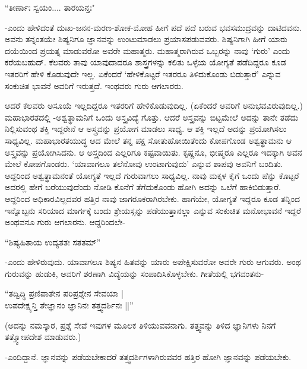 \begin{shloka}
``ತೀರ್ಣಾಃ ಸ್ವಯಂ.... ತಾರಯನ್ತಃ"
\end{shloka}

-ಎಂದು ಹೇಳಿದಂತೆ ದುಃಖ-ಜನನ-ಮರಣ-ಶೋಕ-ಮೋಹ ಹೀಗೆ ಪದೆ ಪದೆ ಬರುವ ಭವಸಮುದ್ರವನ್ನು ದಾಟಿದವನು. ಅವನು ತನ್ನಂತಯೇ ಶಿಷ್ಯನಿಗೂ ಜ್ಞಾನವನ್ನು ಉಂಟುಮಾಡಲು ಪ್ರಯಾಸಪಡುವವರು. ಶಿಷ್ಯನಿಗಾಗಿ ಹೀಗೆ ಯಾರು ದಯೆಯಿಂದ ಪ್ರಯತ್ನ ಮಾಡುವರೋ ಅವರೇ ಮಹಾತ್ಮರು. ಮಹಾತ್ಮರಾಗಿರುವ ಒಬ್ಬರನ್ನು ನಾವು `ಗುರು' ಎಂದು ಕರೆಯಬಹುದ್. ಕೆಲವರು ತಾವು ಯಾವುದಾದರೂ ಶಾಸ್ತ್ರಗಳನ್ನು ಕಲಿತು ಒಳ್ಳೆಯ ಯೋಗ್ಯತೆ ಪಡೆದಿದ್ದರೂ ಕೂಡ ಇತರರಿಗೆ ಹೇಳಿ ಕೊಡುವುದೇ ಇಲ್ಲ. ಏಕೆಂದರೆ `ಹೇಳಿಕೊಟ್ಟರೆ ಇತರರೂ ತಿಳಿದುಕೊಂಡು ಬಿಡುತ್ತಾರೆ' ಎನ್ನುವ ಸಂಕುಚಿತ ಭಾವನೆ ಅವರಿಗೆ ಇರುತ್ತದೆ. ಇಂಥವರು ಗುರು ಆಗಲಾರರು.

ಆದರೆ ಕೆಲವರು ಅಸೂಯೆ ಇಲ್ಲದಿದ್ದರೂ ಇತರರಿಗೆ ಹೇಳಿಕೊಡುವುದಿಲ್ಲ. (ಏಕೆಂದರೆ ಅವರಿಗೆ ಅನುಭವವಿರುವುದಿಲ್ಲ.) ಮಹಾಭಾರತದಲ್ಲಿ -ಅಶ್ವತ್ಥಾಮನಿಗೆ ಒಂದು ಅಸ್ತ್ರವಿದ್ಯೆ ಗೊತ್ತು. ಆದರೆ ಅಸ್ತ್ರವನ್ನು ಬಿಟ್ಟಮೇಲೆ ಅದನ್ನು ತಾನೇ ತಡೆದು ನಿಲ್ಲಿಸುವಂಥ ಶಕ್ತಿ ಇದ್ದರೇನೆ ಆ ಅಸ್ತ್ರವನ್ನು ಪ್ರಯೋಗ ಮಾಡಲು ಸಾಧ್ಯ. ಆ ಶಕ್ತಿ ಇಲ್ಲದೆ ಅದನ್ನು ಪ್ರಯೋಗಿಸಲು ಸಾಧ್ಯವಿಲ್ಲ. ಮಹಾಭಾರತಯುದ್ಧ ಆದ ಮೇಲೆ ತನ್ನ ಪಕ್ಷ ಸೋತುಹೋಯಿತೆಂದು ಕೋಪಗೊಂಡ ಅಶ್ವತ್ಥಾಮನು ಆ ಅಸ್ತ್ರವನ್ನು ಪ್ರಯೋಗಿಸಿದನು. ಆ ಅಸ್ತ್ರದಿಂದ ಎಲ್ಲರಿಗೂ ಕಷ್ಟವಾಯಿತು. ಕೃಷ್ಣನೂ, ಭೀಷ್ಮರೂ ಎಲ್ಲರೂ ಇದಕ್ಕಾಗಿ ಅವನ ಮೇಲೆ ಕೋಪಗೊಂಡರು. `ಯಾವಾಗಲೂ ತಲೆನೋವು ಉಂಟಾಗುವುದು' ಎನ್ನುವ ಶಾಪವು ಅವನಿಗೆ ಬಂದಿತು. ಆದ್ದರಿಂದ ಅಶ್ವತ್ಥಾಮನಂತೆ ಯೋಗ್ಯತೆ ಇಲ್ಲದೆ ಗುರುವಾಗಲು ಸಾಧ್ಯವಿಲ್ಲ. ನಾವು ಮಕ್ಕಳ ಕೈಗೆ ಒಂದು ಪೆನ್ನು ಕೊಟ್ಟರೆ ಅದರಲ್ಲಿ ಹೇಗೆ ಬರೆಯುವುದೆಂದು ನೋಡಿ ಕೊನೆಗೆ ತೆಗೆದುಕೊಂಡು ಹೋಗಿ ಅದನ್ನು ಒಲೆಗೆ ಹಾಕಿಬಿಡುತ್ತಾರೆ. ಆದ್ದರಿಂದ ಅಧಿಕಾರವಿಲ್ಲದವರ ಹತ್ತಿರ ನಾವು ಜಾಗರೂಕರಾಗಿರಬೇಕು. ಹಾಗೆಯೇ, ಯೋಗ್ಯತೆ ಇದ್ದರೂ ಕೂಡ ತನ್ನಿಂದ ಇನ್ನೊಬ್ಬನು ಸರಿಯಾದ ಮಾರ್ಗಕ್ಕೆ ಬಂದು ಶ್ರೇಯಸ್ಸನ್ನು ಪಡೆಯುತ್ತಾನಲ್ಲಾ ಎನ್ನುವ ಸಂಕುಚಿತ ಮನೋಭಾವನೆ ಇದ್ದರೆ ಅಂಥವನೂ ಗುರು ಆಗಲಾರನು. ಆದ್ದರಿಂದಲೇ-

\begin{shloka} 
``ಶಿಷ್ಯಹಿತಾಯ ಉದ್ಯತತಃ ಸತತಮ್'' 
\end{shloka}

-ಎಂದು ಹೇಳಿರುವುದು. ಯಾವಾಗಲೂ ಶಿಷ್ಯನ ಹಿತವನ್ನು ಯಾರು ಅಪೇಕ್ಷಿಸುವರೋ ಅವರೇ ಗುರು ಆಗುವರು. ಅಂಥ ಗುರುವನ್ನು ಹುಡುಕಿ, ಅವರಿಗೆ ಶರಣಾಗಿ ವಿದ್ಯೆಯನ್ನು ಸಂಪಾದಿಸಿಕೊಳ್ಳಬೇಕು. ಗೀತೆಯಲ್ಲಿ ಭಗವಂತನು-

\begin{shloka}
``ತದ್ವಿದ್ಧಿ ಪ್ರಣಿಪಾತೇನ ಪರಿಪ್ರಶ್ನೇನ ಸೇವಯಾ |\\
ಉಪದೇಕ್ಷ್ಯನ್ತಿ ತೇಜ್ಞಾನಂ ಜ್ಞಾನಿನಃ ತತ್ತ್ವದರ್ಶಿನಃ ||''
\end{shloka}

(ಅದನ್ನು ನಮಸ್ಕಾರ, ಪ್ರಶ್ನೆ ಸೇವೆ ಇವುಗಳ ಮೂಲಕ ತಿಳಿಯುವವನಾಗು. ತತ್ತ್ವವನ್ನು ತಿಳಿದ ಜ್ಞಾನಿಗಳು ನಿನಗೆ ತತ್ತ್ವೋಪದೇಶ ಮಾಡುವರು.)

-ಎಂದಿದ್ದಾನೆ. ಜ್ಞಾನವನ್ನು ಪಡೆಯಬೇಕಾದರೆ ತತ್ತ್ವದರ್ಶಿಗಳಾಗಿರುವವರ ಹತ್ತಿರ ಹೋಗಿ ಜ್ಞಾನವನ್ನು ಪಡೆಯಬೇಕು.


